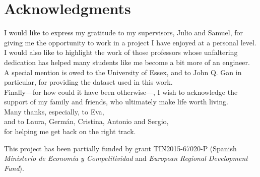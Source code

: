 
\begingroup
\chapter*{Acknowledgments}

I would like to express my gratitude to my supervisors, Julio and Samuel, for giving me the opportunity to work in a project I have enjoyed at a personal level. \\

\noindent
I would also like to highlight the work of those professors whose unfaltering dedication has helped many students like me become a bit more of an engineer. \\

\noindent
A special mention is owed to the University of Essex, and to John Q. Gan in particular, for providing the dataset used in this work. \\

\noindent
Finally---for how could it have been otherwise---, I wish to acknowledge the support of my family and friends, who ultimately make life worth living. \\

\noindent
Many thanks, especially, to Eva, \\
and to Laura, Germán, Cristina, Antonio and Sergio, \\
for helping me get back on the right track.

\vfill

This project has been partially funded by grant TIN2015-67020-P (Spanish \textit{Ministerio de Economía y Competitividad} and \textit{European Regional Development Fund}).

\endgroup
